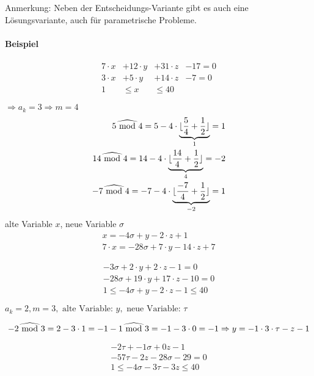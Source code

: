 Anmerkung: Neben der Entscheidungs-Variante gibt es auch eine Lösungsvariante, auch für parametrische Probleme.


\paragraph{Beispiel}
\begin{align}
7 \cdot x &+ 12 \cdot y &+ 31 \cdot z  &-17 = 0\\
3 \cdot x &+ 5 \cdot y &+ 14 \cdot z &- 7 = 0\\
1 &\leq x &\leq 40
\end{align}

\( \Rightarrow a_k = 3 \Rightarrow m = 4\) \\
\[
\begin{split}
 5 \widehat{\textrm{\ mod\ }} 4 = 5-4 \cdot \underbrace{\lfloor \frac{5}{4} + \frac{1}{2} \rfloor}_{1} = 1 \\
  14 \widehat{\textrm{\ mod\ }} 4 = 14-4 \cdot \underbrace{\lfloor \frac{14}{4} + \frac{1}{2} \rfloor}_{4} = -2 \\
   -7 \widehat{\textrm{\ mod\ }} 4 = -7-4 \cdot \underbrace{ \lfloor \frac{-7}{4} + \frac{1}{2} \rfloor }_{-2}= 1
\end{split}
\]
alte Variable \(x\), neue Variable \( \sigma \) \\

\[
\begin{split}
 x = -4 \sigma + y - 2 \cdot z + 1 \\
  7\cdot x = -28 \sigma + 7 \cdot y - 14 \cdot z + 7
\end{split}
\]

\begin{align}
 -3 \sigma +2 \cdot y + 2  \cdot z -1 = 0 \\
 -28 \sigma + 19 \cdot y + 17 \cdot z - 10 = 0 \\
 1 \leq - 4 \sigma + y - 2 \cdot z - 1 \leq 40
\end{align}

\( a_k = 2, m=3, \text{ alte Variable: } y, \text{ neue Variable: } \tau \)

\[
-2 \widehat{\textrm{\ mod\ }} 3 = 2 - 3 \cdot 1 = -1 \\
-1 \widehat{\textrm{\ mod\ }} 3 = -1 -3 \cdot 0 = -1 \\
\Rightarrow y = -1 \cdot 3 \cdot \tau - z - 1
\]

\begin{align}
-2 \tau + -1 \sigma + 0 z - 1\\
-57 \tau - 2 z - 28 \sigma - 29 = 0 \\
1 \leq -4 \sigma - 3 \tau - 3 z \leq 40
\end{align}

